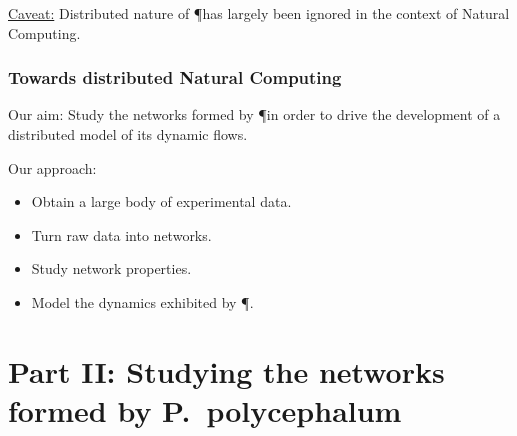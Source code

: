 \documentclass[	hyperref={pdfpagelabels=false}, xcolor=dvipsnames,
		11pt]{beamer}
\begin{document}
\begin{frame}
\begin{columns}
\begin{column}{5cm}
\begin{overprint}
	\end{overprint}
	\end{column}
	\end{columns}

	\begin{alertblock}{\underline{Caveat:}}
		Distributed nature of \P has largely been ignored in the context of Natural Computing.
	\end{alertblock}
\end{frame}

\begin{frame}
    \frametitle{Towards distributed Natural Computing} 

    \begin{block}{Our aim:}
    	Study the networks formed by \P in order to drive the development of a distributed model of its dynamic flows.
    \end{block}

	\begin{alertblock}{Our approach:}
		\begin{itemize}
			\item Obtain a large body of experimental data.
			\item Turn raw data into networks.
			\item Study network properties.
			\item Model the dynamics exhibited by \P.
		\end{itemize}
	\end{alertblock}
\end{frame}

\section{Part II: Studying the networks formed by P.~polycephalum}
\end{document}
